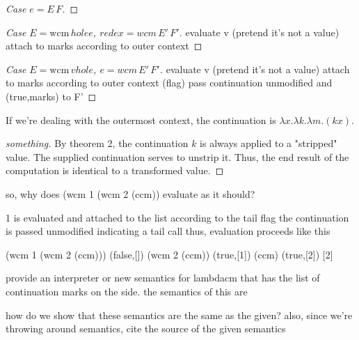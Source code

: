 \documentclass[ms,electronic,twosidetoc,letterpaper,chaptercenter,parttop]{byumsphd}
\begin{document}
\begin{proof}[Case $e=E\,F$]

\end{proof}

\begin{proof}[Case $E=\mathrm{wcm}\,hole e$, $redex=wcm\,E'\,F'$]
evaluate v (pretend it's not a value)
attach to marks according to outer context

\end{proof}

\begin{proof}[Case $E=\mathrm{wcm}\,v hole$, $e=wcm\,E'\,F'$]
evaluate v (pretend it's not a value)
attach to marks according to outer context (flag)
pass continuation unmodified and (true,marks) to F'


\end{proof}

If we're dealing with the outermost context, the continuation is $\lambda x.\lambda k.\lambda m.(k x)$.

\begin{proof}[something]
By theorem 2, the continuation $k$ is always applied to a "stripped" value. The supplied continuation serves to unstrip it. Thus, the end result of the computation is identical to a transformed value.
\end{proof}

so, why does (wcm 1 (wcm 2 (ccm)) evaluate as it should?

1 is evaluated and attached to the list according to the tail flag
the continuation is passed unmodified indicating a tail call
thus, evaluation proceeds like this

(wcm 1 (wcm 2 (ccm))) (false,[])
(wcm 2 (ccm)) (true,[1])
(ccm) (true,[2])
[2]

provide an interpreter or new semantics for lambdacm that has the list of continuation 
marks on the side. the semantics of this are


how do we show that these semantics are the same as the given?
also, since we're throwing around semantics, cite the source of the given semantics
\end{document}
